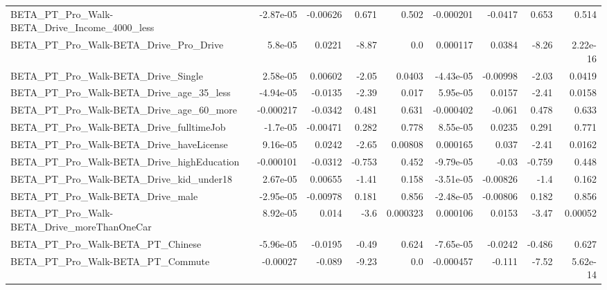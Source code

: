 \begin{tabular}{lrrrrrrrr}
BETA\_PT\_Pro\_Walk-BETA\_Drive\_Income\_4000\_less       &   -2.87e-05 &     -0.00626 &     0.671 &    0.502 &  -0.000201 &     -0.0417 &        0.653 &         0.514 \\
BETA\_PT\_Pro\_Walk-BETA\_Drive\_Pro\_Drive              &     5.8e-05 &       0.0221 &     -8.87 &      0.0 &   0.000117 &      0.0384 &        -8.26 &      2.22e-16 \\
BETA\_PT\_Pro\_Walk-BETA\_Drive\_Single                 &    2.58e-05 &      0.00602 &     -2.05 &   0.0403 &  -4.43e-05 &    -0.00998 &        -2.03 &        0.0419 \\
BETA\_PT\_Pro\_Walk-BETA\_Drive\_age\_35\_less            &   -4.94e-05 &      -0.0135 &     -2.39 &    0.017 &   5.95e-05 &      0.0157 &        -2.41 &        0.0158 \\
BETA\_PT\_Pro\_Walk-BETA\_Drive\_age\_60\_more            &   -0.000217 &      -0.0342 &     0.481 &    0.631 &  -0.000402 &      -0.061 &        0.478 &         0.633 \\
BETA\_PT\_Pro\_Walk-BETA\_Drive\_fulltimeJob            &    -1.7e-05 &     -0.00471 &     0.282 &    0.778 &   8.55e-05 &      0.0235 &        0.291 &         0.771 \\
BETA\_PT\_Pro\_Walk-BETA\_Drive\_haveLicense            &    9.16e-05 &       0.0242 &     -2.65 &  0.00808 &   0.000165 &       0.037 &        -2.41 &        0.0162 \\
BETA\_PT\_Pro\_Walk-BETA\_Drive\_highEducation          &   -0.000101 &      -0.0312 &    -0.753 &    0.452 &  -9.79e-05 &       -0.03 &       -0.759 &         0.448 \\
BETA\_PT\_Pro\_Walk-BETA\_Drive\_kid\_under18            &    2.67e-05 &      0.00655 &     -1.41 &    0.158 &  -3.51e-05 &    -0.00826 &         -1.4 &         0.162 \\
BETA\_PT\_Pro\_Walk-BETA\_Drive\_male                   &   -2.95e-05 &     -0.00978 &     0.181 &    0.856 &  -2.48e-05 &    -0.00806 &        0.182 &         0.856 \\
BETA\_PT\_Pro\_Walk-BETA\_Drive\_moreThanOneCar         &    8.92e-05 &        0.014 &      -3.6 & 0.000323 &   0.000106 &      0.0153 &        -3.47 &       0.00052 \\
BETA\_PT\_Pro\_Walk-BETA\_PT\_Chinese                   &   -5.96e-05 &      -0.0195 &     -0.49 &    0.624 &  -7.65e-05 &     -0.0242 &       -0.486 &         0.627 \\
BETA\_PT\_Pro\_Walk-BETA\_PT\_Commute                   &    -0.00027 &       -0.089 &     -9.23 &      0.0 &  -0.000457 &      -0.111 &        -7.52 &      5.62e-14 \\

\end{tabular}
